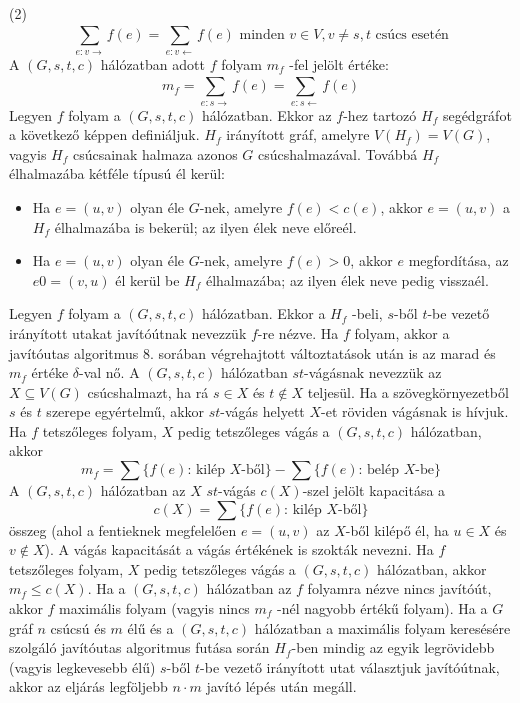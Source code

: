 \documentclass[12pt,a4paper,twoside]{report}
\begin{document}
(2)
\begin{equation}
  \sum_{e:v\rightarrow}^{} f(e)=\sum_{e:v\leftarrow}^{} f(e) \text{ minden } v\in V,v\ne s,t \text{ csúcs esetén}
\end{equation}
\df
A $(G, s,t, c)$ hálózatban adott $f$ folyam $m_f$ -fel jelölt értéke:
\begin{equation}
  m_f=\sum_{e:
    s\rightarrow}^{} f(e)=\sum_{e:s\leftarrow}^{} f(e)
\end{equation}
\df
 Legyen $f$ folyam a $(G, s,t, c)$ hálózatban. Ekkor az $f$-hez tartozó $H_f$ segédgráfot a következő képpen definiáljuk. $H_f$ irányított gráf, amelyre $V (H_f ) = V (G)$, vagyis $H_f$ csúcsainak halmaza azonos $G$ csúcshalmazával. Továbbá $H_f$ élhalmazába kétféle típusú él kerül:
\begin{itemize}
\item Ha $e = (u, v)$ olyan éle $G$-nek, amelyre $f (e) < c(e)$, akkor $e = (u, v)$ a $H_f$ élhalmazába is bekerül; az ilyen élek neve előreél.
\item  Ha $e = (u, v)$ olyan éle $G$-nek, amelyre $f (e) > 0$, akkor $e$ megfordítása, az $e0 = (v, u)$ él kerül be $H_f$ élhalmazába; az ilyen élek neve pedig visszaél.
\end{itemize}
\df
Legyen $f$ folyam a $(G, s,t, c)$ hálózatban. Ekkor a $H_f$ -beli, $s$-ből
$t$-be vezető irányított utakat javítóútnak nevezzük $f$-re nézve.
\al
Ha $f$ folyam, akkor a javítóutas algoritmus $8$. sorában végrehajtott
változtatások után is az marad és $m_f$ értéke $\delta$-val nő.
\df
A $(G, s,t, c)$ hálózatban $st$-vágásnak nevezzük az $X\subseteq V(G)$ csúcshalmazt, ha rá $s\in X$ és $t\notin X$ teljesül. Ha a szövegkörnyezetből $s$ és $t$ szerepe egyértelmű, akkor $st$-vágás helyett $X$-et röviden vágásnak is hívjuk.
\al
Ha $f$ tetszőleges folyam, $X$ pedig tetszőleges vágás a $(G, s,t, c)$ hálózatban, akkor
$$m_f=\sum \{f(e)\text{: kilép } X\text{-ből}\}-\sum \{f(e)\text{: belép } X\text{-be}\} $$
\df
A $(G, s,t, c)$ hálózatban az $X$ $st$-vágás $c(X)$-szel jelölt kapacitása a
$$c(X)=\sum \{f(e)\text{: kilép } X\text{-ből}\}$$
összeg (ahol a fentieknek megfelelően $e = (u, v)$ az $X$-ből kilépő él, ha $u\in X$ és
$v\notin X$). A vágás kapacitását a vágás értékének is szokták nevezni.
\al
Ha $f$ tetszőleges folyam, $X$ pedig tetszőleges vágás a $(G, s,t, c)$ hálózatban, akkor $m_f \leq c(X)$.
\ttl
Ha a $(G, s,t, c)$ hálózatban az $f$ folyamra nézve nincs javítóút, akkor
$f$ maximális folyam (vagyis nincs $m_f$ -nél nagyobb értékű folyam).
\ttl
Ha a $G$ gráf $n$ csúcsú és $m$ élű és a $(G, s,t, c)$ hálózatban a maximális
folyam keresésére szolgáló javítóutas algoritmus futása során $H_f$-ben mindig az
egyik legrövidebb (vagyis legkevesebb élű) $s$-ből $t$-be vezető irányított utat választjuk
javítóútnak, akkor az eljárás legföljebb $n\cdot m$ javító lépés után megáll.
\end{document}
